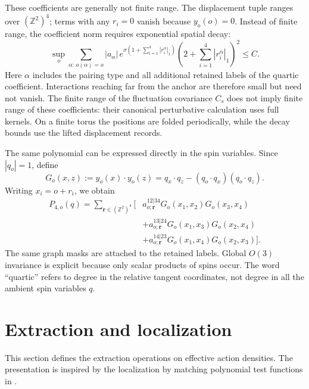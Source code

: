 \documentclass[11pt]{article}
\numberwithin{equation}{section}
\theoremstyle{definition}
\theoremstyle{plain}
\begin{document}
These coefficients are generally not finite range.  The displacement
tuple ranges over $(\mathbb Z^2)^4$; terms with any $r_i=0$ vanish
because $y_o(o)=0$.  Instead of finite range, the coefficient norm
requires exponential spatial decay:
\begin{equation}
 \sup_o\sum_{\alpha:\,o(\alpha)=o}
 |a_\alpha|\,
 e^{\sigma(1+\sum_{i=1}^4|r_i^\alpha|_1)}
 \left(2+\sum_{i=1}^4|r_i^\alpha|_1\right)^2\le C.
\end{equation}
Here $\alpha$ includes the pairing type and all additional retained
labels of the quartic coefficient.  Interactions reaching far from
the anchor are therefore small but need not vanish.  The finite
range of the fluctuation covariance $C_s$ does not imply finite
range of these coefficients: their canonical perturbative calculation
uses full kernels.  On a finite torus the positions are folded
periodically, while the decay bounds use the lifted displacement
records.

The same polynomial can be expressed directly in the spin variables.
Since $|q_o|=1$, define
\begin{equation}
 G_o(x,z):=y_o(x)\cdot y_o(z)
 =q_x\cdot q_z-(q_o\cdot q_x)(q_o\cdot q_z).
\end{equation}
Writing $x_i=o+r_i$, we obtain
\begin{equation}
 \begin{split}
 P_{4,o}(q)=\sum_{\mathbf r\in(\mathbb Z^2)^4}\bigl[&
 a^{12|34}_{o;\mathbf r}G_o(x_1,x_2)G_o(x_3,x_4)\\
 &+a^{13|24}_{o;\mathbf r}G_o(x_1,x_3)G_o(x_2,x_4)\\
 &+a^{14|23}_{o;\mathbf r}G_o(x_1,x_4)G_o(x_2,x_3)\bigr].
 \end{split}
 \label{eq:quartic-anchor-spins}
\end{equation}
The same graph masks are attached to the retained labels.
Global $O(3)$ invariance is explicit because only scalar products
of spins occur.  The word ``quartic'' refers to degree in the
relative tangent coordinates, not degree in all the ambient spin
variables $q$.




\newpage
\section{Extraction and localization}
\label{sec:extraction-localization}

This section defines the extraction operations on effective action densities.
%
The presentation is inspired by the localization by matching polynomial
test functions in \cite{MR3332939}.
\end{document}
